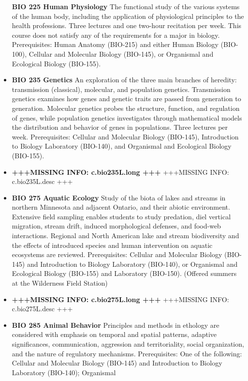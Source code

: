 \documentclass[
  letterpaper,
]{scrbook}
\begin{document}
\begin{itemize}
  \textbf{BIO 225 Human Physiology} The functional study of the various
  systems of the human body, including the application of physiological
  principles to the health professions. Three lectures and one two-hour
  recitation per week. This course does not satisfy any of the
  requirements for a major in biology. Prerequisites: Human Anatomy
  (BIO-215) and either Human Biology (BIO-100), Cellular and Molecular
  Biology (BIO-145), or Organismal and Ecological Biology (BIO-155).
\item
  \textbf{BIO 235 Genetics} An exploration of the three main branches of
  heredity: transmission (classical), molecular, and population
  genetics. Transmission genetics examines how genes and genetic traits
  are passed from generation to generation. Molecular genetics probes
  the structure, function, and regulation of genes, while population
  genetics investigates through mathematical models the distribution and
  behavior of genes in populations. Three lectures per week.
  Prerequisites: Cellular and Molecular Biology (BIO-145), Introduction
  to Biology Laboratory (BIO-140), and Organismal and Ecological Biology
  (BIO-155).
\item
  \textbf{+++MISSING INFO: c.bio235L.long +++} +++MISSING INFO:
  c.bio235L.desc +++
\item
  \textbf{BIO 275 Aquatic Ecology} Study of the biota of lakes and
  streams in northern Minnesota and adjacent Ontario, and their abiotic
  environment. Extensive field sampling enables students to study
  predation, diel vertical migration, stream drift, induced
  morphological defenses, and food-web interactions. Regional and North
  American lake and stream biodiversity and the effects of introduced
  species and human intervention on aquatic ecosystems are reviewed.
  Prerequisites: Cellular and Molecular Biology (BIO-145) and
  Introduction to Biology Laboratory (BIO-140), or Organismal and
  Ecological Biology (BIO-155) and Laboratory (BIO-150). (Offered
  summers at the Wilderness Field Station)
\item
  \textbf{+++MISSING INFO: c.bio275L.long +++} +++MISSING INFO:
  c.bio275L.desc +++
\item
  \textbf{BIO 285 Animal Behavior} Principles and methods in ethology
  are considered with emphasis on temporal and spatial patterns,
  adaptive significances, communication, aggression and territoriality,
  social organization, and the nature of regulatory mechanisms.
  Prerequisites: One of the following: Cellular and Molecular Biology
  (BIO-145) and Introduction to Biology Laboratory (BIO-140); Organismal

\end{itemize}
\end{document}
